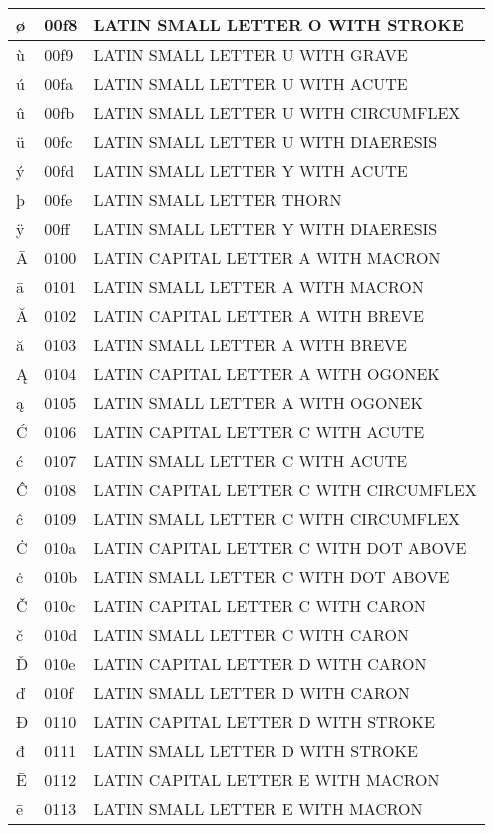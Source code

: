 \documentclass[12pt,letterpaper,openany]{book}
\begin{document}
\begin{center}
\begin{supertabular}{|m{0.25in}|m{0.5in}|m{4in}|}
			ø & 00f8 & LATIN SMALL LETTER O WITH STROKE\\\hline
			ù & 00f9 & LATIN SMALL LETTER U WITH GRAVE\\\hline
			ú & 00fa & LATIN SMALL LETTER U WITH ACUTE\\\hline
			û & 00fb & LATIN SMALL LETTER U WITH CIRCUMFLEX\\\hline
			ü & 00fc & LATIN SMALL LETTER U WITH DIAERESIS\\\hline
			ý & 00fd & LATIN SMALL LETTER Y WITH ACUTE\\\hline
			þ & 00fe & LATIN SMALL LETTER THORN\\\hline
			ÿ & 00ff & LATIN SMALL LETTER Y WITH DIAERESIS\\\hline
			Ā & 0100 & LATIN CAPITAL LETTER A WITH MACRON\\\hline
			ā & 0101 & LATIN SMALL LETTER A WITH MACRON\\\hline
			Ă & 0102 & LATIN CAPITAL LETTER A WITH BREVE\\\hline
			ă & 0103 & LATIN SMALL LETTER A WITH BREVE\\\hline
			Ą & 0104 & LATIN CAPITAL LETTER A WITH OGONEK\\\hline
			ą & 0105 & LATIN SMALL LETTER A WITH OGONEK\\\hline
			Ć & 0106 & LATIN CAPITAL LETTER C WITH ACUTE\\\hline
			ć & 0107 & LATIN SMALL LETTER C WITH ACUTE\\\hline
			Ĉ & 0108 & LATIN CAPITAL LETTER C WITH CIRCUMFLEX\\\hline
			ĉ & 0109 & LATIN SMALL LETTER C WITH CIRCUMFLEX\\\hline
			Ċ & 010a & LATIN CAPITAL LETTER C WITH DOT ABOVE\\\hline
			ċ & 010b & LATIN SMALL LETTER C WITH DOT ABOVE\\\hline
			Č & 010c & LATIN CAPITAL LETTER C WITH CARON\\\hline
			č & 010d & LATIN SMALL LETTER C WITH CARON\\\hline
			Ď & 010e & LATIN CAPITAL LETTER D WITH CARON\\\hline
			ď & 010f & LATIN SMALL LETTER D WITH CARON\\\hline
			Đ & 0110 & LATIN CAPITAL LETTER D WITH STROKE\\\hline
			đ & 0111 & LATIN SMALL LETTER D WITH STROKE\\\hline
			Ē & 0112 & LATIN CAPITAL LETTER E WITH MACRON\\\hline
			ē & 0113 & LATIN SMALL LETTER E WITH MACRON\\\hline

\end{supertabular}
\end{center}
\end{document}
